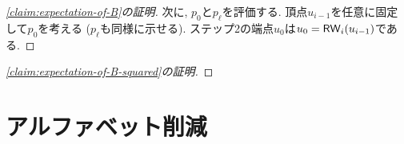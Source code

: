 \begin{proof}[\cref{claim:expectation-of-B}の証明]
  次に, $p_0$と$p_\ell$を評価する.
  頂点$u_{i-1}$を任意に固定して$p_0$を考える ($p_\ell$も同様に示せる).
  ステップ2の端点$u_0$は$u_0=\mathsf{RW}_i(u_{i-1})$である.

\end{proof}

\begin{proof}[\cref{claim:expectation-of-B-squared}の証明]
  
\end{proof}

\section{アルファベット削減}



